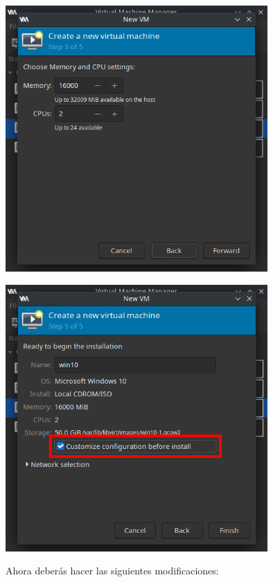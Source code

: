 \documentclass[12pt]{article}
\begin{document}
\begin{multicols}{2}
\begin{minipage}[t]{\linewidth}%
\vspace{0pt}
\includegraphics[width=0.75\textwidth]{images/vm-memory-setup.png}
\end{minipage}
\begin{minipage}[t]{\linewidth}%
\vspace{0pt}
\includegraphics[width=0.75\textwidth]{images/vm-name.png}
\end{minipage}
\end{multicols}

Ahora deberás hacer las siguientes modificaciones:
\end{document}
